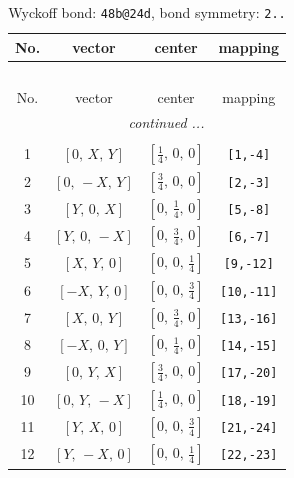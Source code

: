\documentclass[fleqn,8pt]{jsarticle}
\begin{document}
\renewcommand{\arraystretch}{1.2}
\begin{longtable}{cccc}
\caption{Wyckoff bond: {\tt 48b@24d}, bond symmetry: {\tt 2..}}
 \\
 \hline \hline
No. & vector & center & mapping \\ \hline \endfirsthead

\multicolumn{3}{l}{\tablename\ \thetable{}} \\
 \hline \hline
No. & vector & center & mapping \\ \hline \endhead

 \hline \hline
\multicolumn{3}{r}{\footnotesize\it continued ...} \\ \endfoot

 \hline \hline
\multicolumn{3}{r}{} \\ \endlastfoot

1 & $\left[ 0,\, X,\, Y \right]$ & $\left[ \frac{1}{4},\, 0,\, 0 \right]$ & {\tt [1,-4]} \\ \hline
2 & $\left[ 0,\, - X,\, Y \right]$ & $\left[ \frac{3}{4},\, 0,\, 0 \right]$ & {\tt [2,-3]} \\ \hline
3 & $\left[ Y,\, 0,\, X \right]$ & $\left[ 0,\, \frac{1}{4},\, 0 \right]$ & {\tt [5,-8]} \\ \hline
4 & $\left[ Y,\, 0,\, - X \right]$ & $\left[ 0,\, \frac{3}{4},\, 0 \right]$ & {\tt [6,-7]} \\ \hline
5 & $\left[ X,\, Y,\, 0 \right]$ & $\left[ 0,\, 0,\, \frac{1}{4} \right]$ & {\tt [9,-12]} \\ \hline
6 & $\left[ - X,\, Y,\, 0 \right]$ & $\left[ 0,\, 0,\, \frac{3}{4} \right]$ & {\tt [10,-11]} \\ \hline
7 & $\left[ X,\, 0,\, Y \right]$ & $\left[ 0,\, \frac{3}{4},\, 0 \right]$ & {\tt [13,-16]} \\ \hline
8 & $\left[ - X,\, 0,\, Y \right]$ & $\left[ 0,\, \frac{1}{4},\, 0 \right]$ & {\tt [14,-15]} \\ \hline
9 & $\left[ 0,\, Y,\, X \right]$ & $\left[ \frac{3}{4},\, 0,\, 0 \right]$ & {\tt [17,-20]} \\ \hline
10 & $\left[ 0,\, Y,\, - X \right]$ & $\left[ \frac{1}{4},\, 0,\, 0 \right]$ & {\tt [18,-19]} \\ \hline
11 & $\left[ Y,\, X,\, 0 \right]$ & $\left[ 0,\, 0,\, \frac{3}{4} \right]$ & {\tt [21,-24]} \\ \hline
12 & $\left[ Y,\, - X,\, 0 \right]$ & $\left[ 0,\, 0,\, \frac{1}{4} \right]$ & {\tt [22,-23]} \\
\end{longtable}
\end{document}
